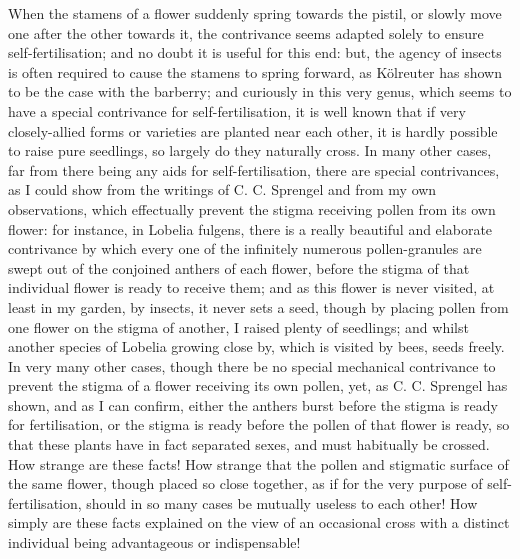 \indent When the stamens of a flower suddenly spring towards the pistil, or slowly move one after the other towards it, the contrivance seems adapted solely to ensure self-fertilisation; and no doubt it is useful for this end: but, the agency of insects is often required to cause the stamens to spring forward, as K\"{o}lreuter has shown to be the case with the barberry; and curiously in this very genus, which seems to have a special contrivance for self-fertilisation, it is well known that if very closely-allied forms or varieties are planted near each other, it is hardly possible to raise pure seedlings, so largely do they naturally cross.  In many other cases, far from there being any aids for self-fertilisation, there are special contrivances, as I could show from the writings of C. C. Sprengel and from my own observations, which effectually prevent the stigma receiving pollen from its own flower: for instance, in Lobelia fulgens, there is a really beautiful and elaborate contrivance by which every one of the infinitely numerous pollen-granules are swept out of the conjoined anthers of each flower, before the stigma of that individual flower is ready to receive them; and as this flower is never visited, at least in my garden, by insects, it never sets a seed, though by placing pollen from one flower on the stigma of another, I raised plenty of seedlings; and whilst another species of Lobelia growing close by, which is visited by bees, seeds freely. In very many other cases, though there be no special mechanical contrivance to prevent the stigma of a flower receiving its own pollen, yet, as C. C. Sprengel has shown, and as I can confirm, either the anthers burst before the stigma is ready for fertilisation, or the stigma is ready before the pollen of that flower is ready, so that these plants have in fact separated sexes, and must habitually be crossed. How strange are these facts! How strange that the pollen and stigmatic surface of the same flower, though placed so close together, as if for the very purpose of self-fertilisation, should in so many cases be mutually useless to each other! How simply are these facts explained on the view of an occasional cross with a distinct individual being advantageous or indispensable! \\
